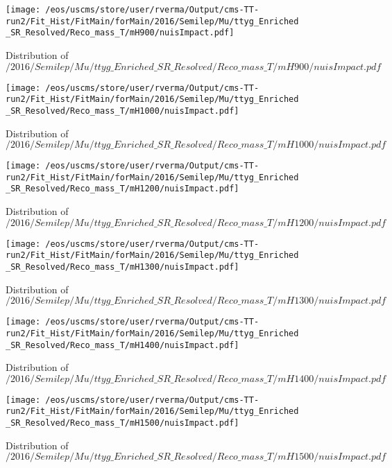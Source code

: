 \begin{figure}
\centering
\texttt{[image: /eos/uscms/store/user/rverma/Output/cms-TT-run2/Fit\_Hist/FitMain/forMain/2016/Semilep/Mu/ttyg\_Enriched\_SR\_Resolved/Reco\_mass\_T/mH900/nuisImpact.pdf]}
\caption{Distribution of $/2016/Semilep/Mu/ttyg\_Enriched\_SR\_Resolved/Reco\_mass\_T/mH900/nuisImpact.pdf$}
\end{figure}

\begin{figure}
\centering
\texttt{[image: /eos/uscms/store/user/rverma/Output/cms-TT-run2/Fit\_Hist/FitMain/forMain/2016/Semilep/Mu/ttyg\_Enriched\_SR\_Resolved/Reco\_mass\_T/mH1000/nuisImpact.pdf]}
\caption{Distribution of $/2016/Semilep/Mu/ttyg\_Enriched\_SR\_Resolved/Reco\_mass\_T/mH1000/nuisImpact.pdf$}
\end{figure}

\begin{figure}
\centering
\texttt{[image: /eos/uscms/store/user/rverma/Output/cms-TT-run2/Fit\_Hist/FitMain/forMain/2016/Semilep/Mu/ttyg\_Enriched\_SR\_Resolved/Reco\_mass\_T/mH1200/nuisImpact.pdf]}
\caption{Distribution of $/2016/Semilep/Mu/ttyg\_Enriched\_SR\_Resolved/Reco\_mass\_T/mH1200/nuisImpact.pdf$}
\end{figure}

\begin{figure}
\centering
\texttt{[image: /eos/uscms/store/user/rverma/Output/cms-TT-run2/Fit\_Hist/FitMain/forMain/2016/Semilep/Mu/ttyg\_Enriched\_SR\_Resolved/Reco\_mass\_T/mH1300/nuisImpact.pdf]}
\caption{Distribution of $/2016/Semilep/Mu/ttyg\_Enriched\_SR\_Resolved/Reco\_mass\_T/mH1300/nuisImpact.pdf$}
\end{figure}

\begin{figure}
\centering
\texttt{[image: /eos/uscms/store/user/rverma/Output/cms-TT-run2/Fit\_Hist/FitMain/forMain/2016/Semilep/Mu/ttyg\_Enriched\_SR\_Resolved/Reco\_mass\_T/mH1400/nuisImpact.pdf]}
\caption{Distribution of $/2016/Semilep/Mu/ttyg\_Enriched\_SR\_Resolved/Reco\_mass\_T/mH1400/nuisImpact.pdf$}
\end{figure}

\begin{figure}
\centering
\texttt{[image: /eos/uscms/store/user/rverma/Output/cms-TT-run2/Fit\_Hist/FitMain/forMain/2016/Semilep/Mu/ttyg\_Enriched\_SR\_Resolved/Reco\_mass\_T/mH1500/nuisImpact.pdf]}
\caption{Distribution of $/2016/Semilep/Mu/ttyg\_Enriched\_SR\_Resolved/Reco\_mass\_T/mH1500/nuisImpact.pdf$}
\end{figure}

